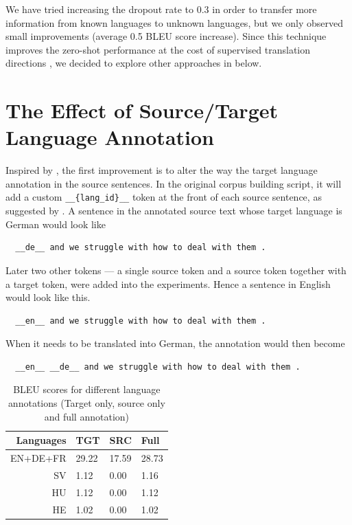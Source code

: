 \documentclass[thesis,fonts=libertine]{cluu}
\begin{document}
We have tried increasing the dropout rate to 0.3 in order to transfer more information from known languages to unknown languages, but we only observed small improvements (average 0.5 BLEU score increase). Since this technique improves the zero-shot performance at the cost of supervised translation directions \textcite{Arivazhagan:2019aa}, we decided to explore other approaches in below.

\section{The Effect of Source/Target Language Annotation}
\label{sec:results_source_and_target_annotation}

Inspired by \textcite{Blackwood:2018aa}, the first improvement is to alter the way the target language annotation in the source sentences. In the original corpus building script, it will add a custom \verb|__{lang_id}__| token at the front of each source sentence, as suggested by \textcite{Johnson:2016aa}. A sentence in the annotated source text whose target language is German would look like 

\begin{verbatim}
  __de__ and we struggle with how to deal with them .
\end{verbatim}

Later two other tokens --- a single source token and a source token together with a target token, were added into the experiments. Hence a sentence in English would look like this. 

\begin{verbatim}
  __en__ and we struggle with how to deal with them .
\end{verbatim}

When it needs to be translated into German, the annotation would then become 

\begin{verbatim}
  __en__ __de__ and we struggle with how to deal with them .
\end{verbatim}

\begin{table}
  \centering
  \begin{tabular}{|r*{3}{|l}|}
  \hline
  Languages & TGT & SRC & Full \\
  \hline\hline
  EN+DE+FR & 29.22 & 17.59 & 28.73 \\
  \hline
  SV & 1.12 & 0.00 & 1.16 \\
  \hline
  HU & 1.12 & 0.00 & 1.12 \\
  \hline
  HE & 1.02 & 0.00 & 1.02 \\
  \hline
  \end{tabular}
  \caption{BLEU scores for different language annotations (Target only, source only and full annotation)}
  \label{table:altering_lang_id}
\end{table}
\end{document}
